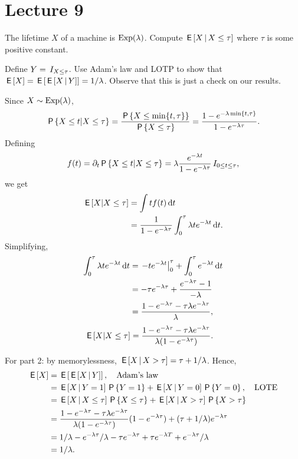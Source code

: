 \documentclass[lectures]{subfiles}
\begin{document}
\section{Lecture 9}
\label{sec:lecture-9}




\begin{exercise}
The lifetime $X$ of a machine is $\Exp{\lambda}$.
Compute $\E{X \given X\leq \tau}$ where $\tau$ is some positive constant.

Define $Y=\1{X\leq \tau}$.  Use  Adam's law and LOTP to show that $\E{X} = \E{\E{X\given Y}} = 1/\lambda$. Observe that this is just a check on our results.
\begin{solution}
Since $X\sim \Exp{\lambda}$,
\begin{equation*}
\P{X\leq t | X\leq \tau} = \frac{\P{X\leq \min\{t, \tau\}}}{\P{X\leq \tau}} = \frac{1-e^{-\lambda\min\{t, \tau\}}}{1-e^{-\lambda \tau}}.
\end{equation*}
 Defining
\begin{equation*}
  f(t) = \partial_{t} \P{X\leq t | X\leq \tau} = \lambda \frac{e^{-\lambda t}}{1-e^{-\lambda \tau}} \1{0\leq t \leq \tau},
\end{equation*}
we get
\begin{align}
  \label{eq:25}
\E{X|X\leq \tau}
&= \int t f(t) \d t \\
&= \frac{1}{1-e^{-\lambda \tau}}\int_{0}^{\tau} \lambda t e^{-\lambda t} \d t.
\end{align}
Simplifying,
\begin{align}
\label{eq:26}
\int_0^{\tau} \lambda t e^{-\lambda t} \d t
&= \left.- t e^{-\lambda t}\right|_{0}^{\tau} + \int_0^{\tau} e^{-\lambda t} \d t \\
&= -\tau e^{-\lambda \tau} + \frac{e^{-\lambda \tau} -1}{-\lambda} \\
&= \frac{ 1- e^{-\lambda \tau}- \tau \lambda  e^{-\lambda \tau}}{\lambda},
\end{align}
\begin{align}
  \label{eq:25}
\E{X|X\leq \tau}
&= \frac{ 1- e^{-\lambda \tau}- \tau \lambda  e^{-\lambda \tau}}{\lambda(1-e^{-\lambda \tau})}.
\end{align}

For part 2: by memorylessness, $\E{X\given X>\tau} = \tau + 1/\lambda$. Hence,
\begin{align}
  \label{eq:4}
\E X
&= \E{\E{X\given Y}}, \quad \text{Adam's law} \\
&= \E{X\given Y=1}\P{Y=1} + \E{X\given Y=0}\P{Y=0}, \quad \text{LOTE}\\
&= \E{X\given X\leq \tau}\P{X\leq \tau} + \E{X\given X>\tau} \P{X>\tau} \\
&= \frac{ 1- e^{-\lambda \tau}- \tau \lambda  e^{-\lambda \tau}}{\lambda(1-e^{-\lambda \tau})} (1-e^{-\lambda \tau}) + (\tau+ 1/\lambda) e^{-\lambda \tau} \\
&= 1/\lambda - e^{-\lambda \tau}/\lambda - \tau e^{-\lambda \tau} + \tau e^{-\lambda T} + e^{-\lambda \tau}/\lambda \\
&=1/\lambda.
\end{align}


\end{solution}
\end{exercise}
\end{document}
